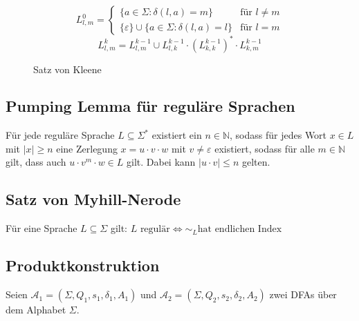 \documentclass[a4paper, 11pt, accentcolor = tud3b]{tudreport}
\begin{document}
            \begin{figure}[ht]
                \label{f:kleene}
                \centering
                \begin{equation*}
                    L ^ 0 _ { l, m } =
                    \begin{cases}
                        \{ a \in \Sigma : \delta(l, a) = m \}                         & \text{für } l \neq m
                        \\
                        \{ \varepsilon \} \cup \{ a \in \Sigma : \delta(l, a) = l \}  & \text{für } l = m
                    \end{cases}
                \end{equation*}
                \[ L ^ k _ { l, m } = L ^ { k - 1 } _ { l, m } \cup L ^ { k - 1 } _ { l, k } \cdot (L ^ { k - 1 } _ { k, k }) ^ * \cdot L ^ { k - 1 } _ { k, m } \]
                \caption{Satz von Kleene}
            \end{figure}


        \subsection{Pumping Lemma für reguläre Sprachen}
            Für jede reguläre Sprache $ L \subseteq \Sigma ^ * $ existiert ein $ n \in \mathbb{N} $, sodass für jedes Wort $ x \in L $ mit $ \vert x \vert \geq n $ eine Zerlegung $ x = u \cdot v \cdot w $ mit $ v \neq \varepsilon $ existiert, sodass für alle $ m \in \mathbb{N} $ gilt, dass auch $ u \cdot v ^ m \cdot w \in L $ gilt. Dabei kann $ \vert u \cdot v \vert \leq n $ gelten.



        \subsection{Satz von Myhill-Nerode}
            Für eine Sprache $ L \subseteq \Sigma $ gilt: $ L \text{ regulär} \iff \sim _ L \text{hat endlichen Index} $



        \subsection{Produktkonstruktion}
            Seien $ \mathcal{A} _ 1 = (\Sigma, Q _ 1, s _ 1, \delta _ 1, A _ 1) $ und $ \mathcal{A} _ 2 = (\Sigma, Q _ 2, s _ 2, \delta _ 2, A _ 2) $ zwei DFAs über dem Alphabet $ \Sigma $.
\end{document}
